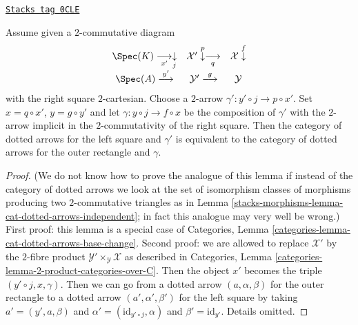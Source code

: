 \begin{lemma}
\label{stacks-morphisms-lemma-cat-dotted-arrows-base-change}
\href{https://stacks.math.columbia.edu/tag/0CLE}{\texttt{Stacks tag 0CLE}}

Assume given a $2$-commutative diagram
$$
\begin{array}{ccc}\Spec(K) \underset{x'}{\longrightarrow}\underset{j}{\downarrow} & \mathcal{X}' \overset{p}{\downarrow}\underset{q}{\longrightarrow} & \mathcal{X} \overset{f}{\downarrow} \\ \Spec(A) \overset{y'}{\longrightarrow} & \mathcal{Y}' \overset{g}{\longrightarrow} & \mathcal{Y}\end{array}
$$
with the right square $2$-cartesian. Choose a $2$-arrow
$\gamma' : y' \circ j \to p \circ x'$. Set
$x = q \circ x'$, $y = g \circ y'$ and let
$\gamma : y \circ j \to f \circ x$ be the composition of
$\gamma'$ with the $2$-arrow implicit in the $2$-commutativity
of the right square. Then the category of dotted arrows
for the left square and $\gamma'$ is equivalent to the category of dotted
arrows for the outer rectangle and $\gamma$.
\end{lemma}

\begin{proof}
(We do not know how to prove the analogue of this lemma if instead
of the category of dotted arrows we look at the set of isomorphism
classes of morphisms producing two $2$-commutative
triangles as in Lemma \ref{stacks-morphisms-lemma-cat-dotted-arrows-independent};
in fact this analogue may very well be wrong.)
First proof: this lemma is a special case of Categories,
Lemma \ref{categories-lemma-cat-dotted-arrows-base-change}.
Second proof: we are allowed to replace
$\mathcal{X}'$ by the $2$-fibre product
$\mathcal{Y}' \times_\mathcal{Y} \mathcal{X}$
as described in Categories, Lemma
\ref{categories-lemma-2-product-categories-over-C}.
Then the object $x'$ becomes the triple $(y' \circ j, x, \gamma)$.
Then we can go from a dotted arrow $(a, \alpha, \beta)$ for the
outer rectangle to a dotted arrow $(a', \alpha', \beta')$
for the left square by taking $a' = (y', a, \beta)$ and
$\alpha' = (\text{id}_{y' \circ j}, \alpha)$ and
$\beta' = \text{id}_{y'}$. Details omitted.
\end{proof}

